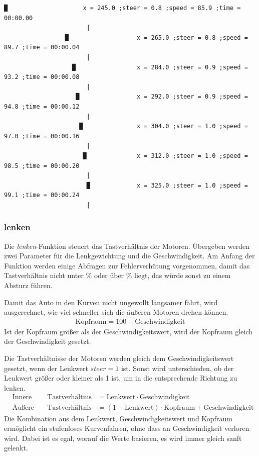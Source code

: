 \documentclass[a4paper, 12pt]{scrartcl}
\begin{document}
\begin{lstlisting}[numbers=none]
               █                     x = 245.0 ;steer = 0.8 ;speed = 85.9 ;time = 00:00.00
                       |
                 █                   x = 265.0 ;steer = 0.8 ;speed = 89.7 ;time = 00:00.04
                       |
                   █                 x = 284.0 ;steer = 0.9 ;speed = 93.2 ;time = 00:00.08
                       |
                    █                x = 292.0 ;steer = 0.9 ;speed = 94.8 ;time = 00:00.12
                       |
                     █               x = 304.0 ;steer = 1.0 ;speed = 97.0 ;time = 00:00.16
                       |
                      █              x = 312.0 ;steer = 1.0 ;speed = 98.5 ;time = 00:00.20
                       |
                       █             x = 325.0 ;steer = 1.0 ;speed = 99.1 ;time = 00:00.24
                       |
\end{lstlisting}

\subsubsection{lenken}


Die \textit{lenken}-Funktion steuert das Tastverhältnis der Motoren. Übergeben werden zwei Parameter für die Lenkgewichtung und die Geschwindigkeit. Am Anfang der Funktion werden einige Abfragen zur Fehlerverhütung vorgenommen, damit das Tastverhältnis nicht unter \unit[0]{\%} oder über \unit[100]{\%} liegt, das würde sonst zu einem Absturz führen.

Damit das Auto in den Kurven nicht ungewollt langsamer fährt, wird ausgerechnet, wie viel schneller sich die äußeren Motoren drehen können.
\begin{align}
\text{Kopfraum} = 100-\text{Geschwindigkeit}
\end{align}
Ist der Kopfraum größer als der Geschwindigkeitswert, wird der Kopfraum gleich der Geschwindigkeit gesetzt.

Die Tastverhältnisse der Motoren werden gleich dem Geschwindigkeitswert gesetzt, wenn der Lenkwert $steer=1$ ist. Sonst wird unterschieden, ob der Lenkwert größer oder kleiner als 1 ist, um in die entsprechende Richtung zu lenken.
\begin{align}
	&\text{Innere Motoren:} &\text{Tastverhältnis} &= \text{Lenkwert}\cdot\text{Geschwindigkeit}\\
	&\text{Äußere Motoren:} &\text{Tastverhältnis} &= (1-\text{Lenkwert})\cdot\text{Kopfraum}+\text{Geschwindigkeit}
\end{align}
Die Kombination aus dem Lenkwert, Geschwindigkeitswert und Kopfraum ermöglicht ein stufenloses Kurvenfahren, ohne dass an Geschwindigkeit verloren wird. Dabei ist es egal, worauf die Werte basieren, es wird immer gleich sanft gelenkt.
\end{document}
